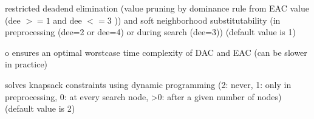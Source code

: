 \documentclass[letterpaper,10pt,openany,oneside,english]{sphinxmanual}
\begin{document}
\begin{description}
\sphinxAtStartPar
restricted dead\sphinxhyphen{}end elimination  (value pruning by dominance rule from EAC value (dee \(>=1\)  and dee \(<=3\) )) and soft neighborhood substitutability (in preprocessing (dee=2 or dee=4) or during search (dee=3)) (default value is 1)

\end{description}
\begin{optionlist}{3cm}
\item [\sphinxhyphen{}o]  
\sphinxAtStartPar
ensures an optimal worst\sphinxhyphen{}case time complexity of DAC and EAC
(can be slower in practice)
\end{optionlist}
\begin{description}
\sphinxAtStartPar
solves knapsack constraints using dynamic programming
(\sphinxhyphen{}2: never, \sphinxhyphen{}1: only in preprocessing, 0: at every search node, \textgreater{}0: after a given number of nodes) (default value is \sphinxhyphen{}2)

\end{description}
\end{document}
